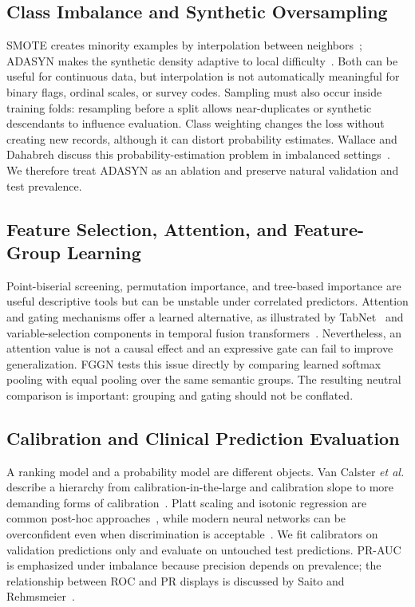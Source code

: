 \documentclass[conference,10pt]{IEEEtran}
\begin{document}
\subsection{Class Imbalance and Synthetic Oversampling}
SMOTE creates minority examples by interpolation between neighbors~\cite{chawla2002smote}; ADASYN makes the synthetic density adaptive to local difficulty~\cite{he2008adasyn}. Both can be useful for continuous data, but interpolation is not automatically meaningful for binary flags, ordinal scales, or survey codes. Sampling must also occur inside training folds: resampling before a split allows near-duplicates or synthetic descendants to influence evaluation. Class weighting changes the loss without creating new records, although it can distort probability estimates. Wallace and Dahabreh discuss this probability-estimation problem in imbalanced settings~\cite{wallace2012cost}. We therefore treat ADASYN as an ablation and preserve natural validation and test prevalence.

\subsection{Feature Selection, Attention, and Feature-Group Learning}
Point-biserial screening, permutation importance, and tree-based importance are useful descriptive tools but can be unstable under correlated predictors. Attention and gating mechanisms offer a learned alternative, as illustrated by TabNet~\cite{arik2021tabnet} and variable-selection components in temporal fusion transformers~\cite{lim2021temporal}. Nevertheless, an attention value is not a causal effect and an expressive gate can fail to improve generalization. FGGN tests this issue directly by comparing learned softmax pooling with equal pooling over the same semantic groups. The resulting neutral comparison is important: grouping and gating should not be conflated.

\subsection{Calibration and Clinical Prediction Evaluation}
A ranking model and a probability model are different objects. Van Calster \emph{et al.} describe a hierarchy from calibration-in-the-large and calibration slope to more demanding forms of calibration~\cite{vancalster2016calibration}. Platt scaling and isotonic regression are common post-hoc approaches~\cite{platt1999probabilistic,niculescu2005predicting}, while modern neural networks can be overconfident even when discrimination is acceptable~\cite{guo2017calibration}. We fit calibrators on validation predictions only and evaluate on untouched test predictions. PR-AUC is emphasized under imbalance because precision depends on prevalence; the relationship between ROC and PR displays is discussed by Saito and Rehmsmeier~\cite{saito2015precision}.
\end{document}
